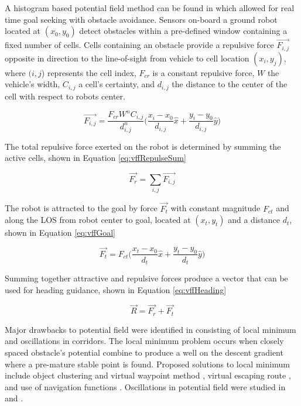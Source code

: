 \documentclass[conf]{new-aiaa}
\begin{document}
A histogram based potential field method can be found in \cite{borenstein_real-time_1990,borenstein_vector_1991,koren_potential_1991} which allowed for real time goal seeking with obstacle avoidance. Sensors on-board a ground robot located at $(x_0,y_0)$ detect obstacles within a pre-defined window containing a fixed number of cells. Cells containing an obstacle provide a repulsive force $\overrightarrow{F_{i,j}}$ opposite in direction to the line-of-sight from vehicle to cell location $(x_i,y_j)$, where $(i,j$) represents the cell index, $F_{cr}$ is a constant repulsive force, $W$ the vehicle's width, $C_{i,j}$ a cell's certainty, and $d_{i,j}$ the distance to the center of the cell with respect to robots center.

\begin{equation}\label{eq:vffRepulse}
\overrightarrow{F_{i,j}} = \frac{F_{cr}W^nC_{i,j}}{d^n_{i,j}} \bigg( \frac{x_i-x_0}{d_{i,j}}\hat{x} + \frac{y_i-y_0}{d_{i,j}}\hat{y}\bigg)
\end{equation}

The total repulsive force exerted on the robot is determined by summing the active cells, shown in Equation \ref{eq:vffRepulseSum}


\begin{equation}\label{eq:vffRepulseSum}
\overrightarrow{F_r} = \sum_{i,j}\overrightarrow{F_{i,j}}
\end{equation}

The robot is attracted to the goal by force $\overrightarrow{F_t}$ with constant magnitude $F_{ct}$ and along the LOS from robot center to goal, located at $(x_t,y_t)$ and a distance $d_t$, shown in Equation \ref{eq:vffGoal}

\begin{equation}\label{eq:vffGoal}
\overrightarrow{F_t} = F_{ct} \bigg( \frac{x_t-x_0}{d_{t}}\hat{x} + \frac{y_t-y_0}{d_{t}}\hat{y}\bigg)
\end{equation}

Summing together attractive and repulsive forces produce a vector that can be used for heading guidance, shown in Equation \ref{eq:vffHeading}

\begin{equation}\label{eq:vffHeading}
\overrightarrow{R} = \overrightarrow{F_r} + \overrightarrow{F_t}
\end{equation}

 Major drawbacks to potential field were identified in \cite{koren_potential_1991} consisting of local minimum and oscillations in corridors. The local minimum problem occurs when closely spaced obstacle's potential combine to produce a well on the descent gradient where a pre-mature stable point is found. Proposed solutions to local minimum include object clustering and virtual waypoint method \cite{liu_virtual-waypoint_2016}, virtual escaping route \cite{kim_escaping_2009}, and use of navigation functions \cite{goerzen_survey_2010}. Oscillations in potential field were studied in \cite{lei_tang_novel_2010} and \cite{li_efficient_2012}.
\end{document}
